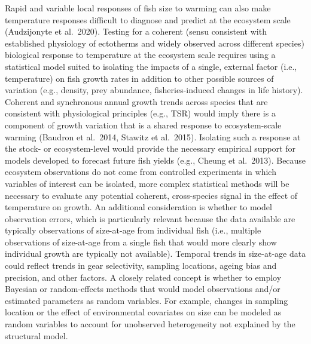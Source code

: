 \documentclass[]{article}
\begin{document}
Rapid and variable local responses of fish size to warming can also make
temperature responses difficult to diagnose and predict at the ecosystem
scale (Audzijonyte et al.~2020). Testing for a coherent (sensu
consistent with established physiology of ectotherms and widely observed
across different species) biological response to temperature at the
ecosystem scale requires using a statistical model suited to isolating
the impacts of a single, external factor (i.e., temperature) on fish
growth rates in addition to other possible sources of variation (e.g.,
density, prey abundance, fisheries-induced changes in life history).
Coherent and synchronous annual growth trends across species that are
consistent with physiological principles (e.g., TSR) would imply there
is a component of growth variation that is a shared response to
ecosystem-scale warming (Baudron et al.~2014, Stawitz et al.~2015).
Isolating such a response at the stock- or ecosystem-level would provide
the necessary empirical support for models developed to forecast future
fish yields (e.g., Cheung et al.~2013). Because ecosystem observations
do not come from controlled experiments in which variables of interest
can be isolated, more complex statistical methods will be necessary to
evaluate any potential coherent, cross-species signal in the effect of
temperature on growth. An additional consideration is whether to model
observation errors, which is particularly relevant because the data
available are typically observations of size-at-age from individual fish
(i.e., multiple observations of size-at-age from a single fish that
would more clearly show individual growth are typically not available).
Temporal trends in size-at-age data could reflect trends in gear
selectivity, sampling locations, ageing bias and precision, and other
factors. A closely related concept is whether to employ Bayesian or
random-effects methods that would model observations and/or estimated
parameters as random variables. For example, changes in sampling
location or the effect of environmental covariates on size can be
modeled as random variables to account for unobserved heterogeneity not
explained by the structural model.
\end{document}
